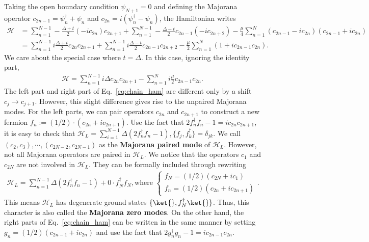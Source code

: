 Taking the open boundary condition  $\psi_{N+1} = 0$ and defining the Majorana operator $c_{2n-1} =   \psi_{n}^\dagger +\psi_{n}$ and $c_{2n} =  i(\psi_{n}^\dagger -  \psi_{n})$, the Hamiltonian writes
\begin{align}
\mathcal{H} &= \sum_{n = 1}^{N-1}-\frac{\Delta + t}{2} (-ic_{2n})c_{2n+1}+\sum_{n = 1}^{N-1}-\frac{\Delta - t}{2} c_{2n-1}(-ic_{2n+2}) - \frac{\mu}{4} \sum_{n = 1}^N(c_{2n-1} -i c_{2n} )(c_{2n-1} +i c_{2n} )\\ 
&= \sum_{n = 1}^{N-1}i\frac{\Delta + t}{2} c_{2n}c_{2n+1}    + \sum_{n = 1}^{N-1}i\frac{\Delta - t}{2} c_{2n-1}c_{2n+2} - \frac{\mu}{2}\sum_{n =1}^N(1 + i c_{2n-1}c_{2n}).
\end{align}
We care about the special case where $t = \Delta$. In this case, ignoring the identity part, 
\begin{align}\label{eq:chain_ham}
    \mathcal{H} = \sum_{n = 1}^{N-1}i\Delta c_{2n}c_{2n+1}-\sum_{n =1}^N i \frac{\mu}{2} c_{2n-1}c_{2n}.
\end{align}
The left part and right part of Eq.~\eqref{eq:chain_ham} are different only by a shift $c_j \to c_{j+1}$. However, this slight difference gives rise to the unpaired Majorana modes.
For the left parts, we can pair operators $c_{2n}$ and  $c_{2n+1}$ to construct a new fermion $f_n := (1/2)\cdot (c_{2n} + ic_{2n+1})$. 
Use the fact that $2f_n^\dagger f_n - 1 = ic_{2n}c_{2n+1} $, it is easy to check that $\mathcal{H}_{L} = \sum_{i =1}^{N-1}\Delta(2 f_n^\dagger f_n -1), \{f_j,f_k^\dagger\} = \delta_{jk}$.
We call $(c_2,c_3),\cdots,(c_{2N-2}, c_{2N-1})$ as the \textbf{Majorana paired mode} of $\mathcal{H}_L$.  However, not all Majorana operators are paired in $\mathcal{H}_L$. We notice that the operators $c_1$ and $c_{2N}$ are not involved in $\mathcal{H}_L$. They can be formally included through rewriting
\begin{align}
    \mathcal{H}_L = \sum_{n =1}^{N-1}\Delta(2 f_n^\dagger f_n -1) + 0\cdot f_N^\dagger f_N, \text{where~}\begin{cases}f_N = (1/2)(c_{2N} + ic_1)\\f_n = (1/2) (c_{2n} + ic_{2n+1})\end{cases}.
\end{align}
 This means $\mathcal{H}_L$ has degenerate ground states $\{\ket{},f_N^\dagger \ket{}\}$. 
 Thus, this character is also called the\textbf{ Majorana zero modes}. 
On the other hand, the right parts of Eq.~\eqref{eq:chain_ham} can be written in the same manner by setting $g_n = (1/2) (c_{2n-1} + ic_{2n})$ and use the fact that $2g_n^\dagger g_n - 1 = ic_{2n-1}c_{2n} $. 
